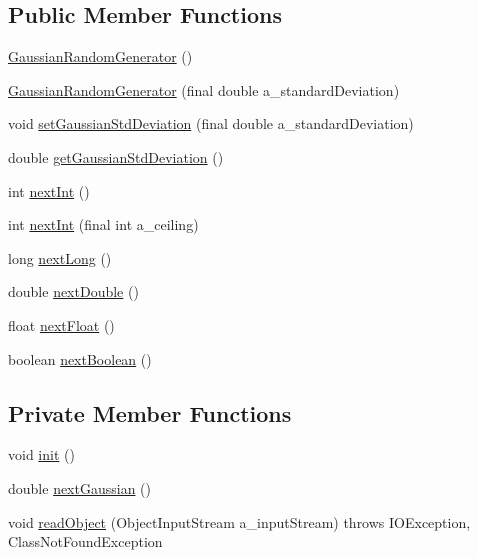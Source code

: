 \subsection*{Public Member Functions}
\begin{DoxyCompactItemize}
\item 
\hyperlink{classorg_1_1jgap_1_1impl_1_1_gaussian_random_generator_a2871c5bd1227c8a34197955d9f752afd}{Gaussian\-Random\-Generator} ()
\item 
\hyperlink{classorg_1_1jgap_1_1impl_1_1_gaussian_random_generator_a95775aac692072a487de922f6c1a516f}{Gaussian\-Random\-Generator} (final double a\-\_\-standard\-Deviation)
\item 
void \hyperlink{classorg_1_1jgap_1_1impl_1_1_gaussian_random_generator_a03d196e9eff9b867e34edc8d1ea41bf3}{set\-Gaussian\-Std\-Deviation} (final double a\-\_\-standard\-Deviation)
\item 
double \hyperlink{classorg_1_1jgap_1_1impl_1_1_gaussian_random_generator_a1635642b24a965dc72f82240b575ef6a}{get\-Gaussian\-Std\-Deviation} ()
\item 
int \hyperlink{classorg_1_1jgap_1_1impl_1_1_gaussian_random_generator_a2e174018c76eddb6c09c05eceeb83e11}{next\-Int} ()
\item 
int \hyperlink{classorg_1_1jgap_1_1impl_1_1_gaussian_random_generator_ab825ac259fdacdd0cebecfaa6cea44bf}{next\-Int} (final int a\-\_\-ceiling)
\item 
long \hyperlink{classorg_1_1jgap_1_1impl_1_1_gaussian_random_generator_a88b311f4d24b41b670187515bd6795b7}{next\-Long} ()
\item 
double \hyperlink{classorg_1_1jgap_1_1impl_1_1_gaussian_random_generator_ae84caa388b60147fac8fbba721275cca}{next\-Double} ()
\item 
float \hyperlink{classorg_1_1jgap_1_1impl_1_1_gaussian_random_generator_a20b553e1eaf81d7fdb405dbb8201aa19}{next\-Float} ()
\item 
boolean \hyperlink{classorg_1_1jgap_1_1impl_1_1_gaussian_random_generator_a26567fd1a8a095c2dbf12c552d2da0be}{next\-Boolean} ()
\end{DoxyCompactItemize}
\subsection*{Private Member Functions}
\begin{DoxyCompactItemize}
\item 
void \hyperlink{classorg_1_1jgap_1_1impl_1_1_gaussian_random_generator_af7d50d80a6da0555d358ffe29bd7e567}{init} ()
\item 
double \hyperlink{classorg_1_1jgap_1_1impl_1_1_gaussian_random_generator_ab3f21b622c8c12df010b95dc5d84eafb}{next\-Gaussian} ()
\item 
void \hyperlink{classorg_1_1jgap_1_1impl_1_1_gaussian_random_generator_a6ec137db76575acdde40b13f3e702d13}{read\-Object} (Object\-Input\-Stream a\-\_\-input\-Stream)  throws I\-O\-Exception, Class\-Not\-Found\-Exception 
\end{DoxyCompactItemize}
